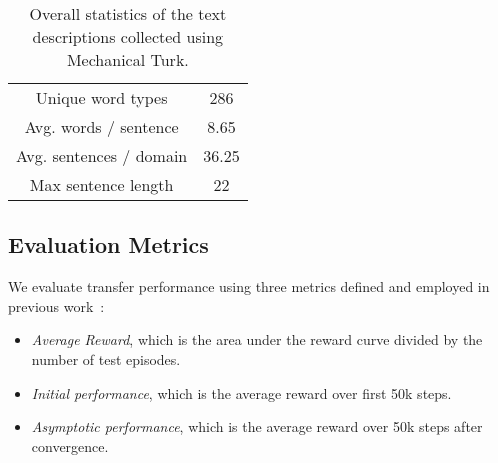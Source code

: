 


\begin{table}[h]
\centering
\begin{tabular}{  c  c  } \toprule
Unique word types &  286 \\ 
Avg. words / sentence &  8.65\\
Avg. sentences / domain & 36.25 \\
Max sentence length & 22 \\ \bottomrule
\end{tabular}
\caption{Overall statistics of the text descriptions collected using Mechanical Turk.}
\label{table:stats}
\end{table}


\subsection{Evaluation Metrics}
We evaluate transfer performance using three metrics defined and employed in previous work~\cite{taylor2009transfer}:
\begin{itemize}[leftmargin=0.45cm]
\item \emph{Average Reward}, which is the area under the reward curve divided by the number of test episodes.
\item \emph{Initial performance}, which is the average reward over first 50k steps. 
\item \emph{Asymptotic performance}, which is the average reward over 50k steps after convergence. 
\end{itemize}

